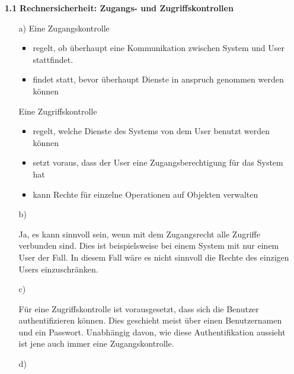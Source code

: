 \documentclass[a4paper,11pt]{article}
\author{\authorinfo}
\title{\titleinfo}
\date{\today}
\begin{document}
\maketitle


\begin{enumerate}
\item[\textbf{1.1}]
    \textbf{Rechnersicherheit: Zugangs- und Zugriffskontrollen}
    \begin{enumerate}
        \item[a)]
            Eine Zugangskontrolle

            \begin{itemize}
                \item regelt, ob überhaupt eine Kommunikation zwischen System und User
                stattfindet.
                \item findet statt, bevor überhaupt Dienste in anspruch genommen werden können
            \end{itemize}

            Eine Zugriffskontrolle

            \begin{itemize}
                \item regelt, welche Dienste des Systems von dem User benutzt werden können
                \item setzt voraus, dass der User eine Zugangsberechtigung für das System hat
                \item kann Rechte für einzelne Operationen auf Objekten verwalten
            \end{itemize}

        \item[b)]

            Ja, es kann sinnvoll sein, wenn mit dem Zugangsrecht alle Zugriffe verbunden sind.
            Dies ist beispielsweise bei einem System mit nur einem User der Fall. In diesem
            Fall wäre es nicht sinnvoll die Rechte des einzigen Users einzuschränken.

        \item[c)]

            Für eine Zugriffskontrolle ist vorausgesetzt, dass sich die Benutzer authentifizieren
            können. Dies geschieht meist über einen Benutzernamen und ein Passwort. Unabhängig davon,
            wie diese Authentifikation aussieht ist jene auch immer eine Zugangskontrolle.

        \item[d)]


\end{enumerate}
\end{enumerate}
\end{document}
